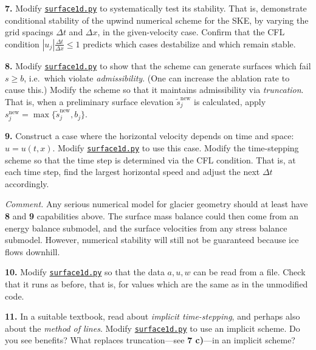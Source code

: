\documentclass[12pt]{amsart}
\newcommand{\prob}[1]{\bigskip\noindent\textbf{#1.}\quad }
\begin{document}
\prob{7}  Modify \href{https://github.com/bueler/mccarthy/blob/master/py/surface1d.py}{\texttt{surface1d.py}} to systematically test its stability.  That is, demonstrate conditional stability of the upwind numerical scheme for the SKE, by varying the grid spacings $\Delta t$ and $\Delta x$, in the given-velocity case.  Confirm that the CFL condition $|u_j| \frac{\Delta t}{\Delta x} \le 1$ predicts which cases destabilize and which remain stable.

\prob{8}  Modify \href{https://github.com/bueler/mccarthy/blob/master/py/surface1d.py}{\texttt{surface1d.py}} to show that the scheme can generate surfaces which fail $s\ge b$, i.e.~which violate \emph{admissibility}.  (One can increase the ablation rate to cause this.)  Modify the scheme so that it maintains admissibility via \emph{truncation}.  That is, when a preliminary surface elevation ${\tilde s}_j^{\text{new}}$ is calculated, apply $s_j^{\text{new}} = \max\{{\tilde s}_j^{\text{new}},b_j\}$.

\prob{9}  Construct a case where the horizontal velocity depends on time and space: $u=u(t,x)$.  Modify \href{https://github.com/bueler/mccarthy/blob/master/py/surface1d.py}{\texttt{surface1d.py}} to use this case.  Modify the time-stepping scheme so that the time step is determined via the CFL condition.  That is, at each time step, find the largest horizontal speed and adjust the next $\Delta t$ accordingly.

\medskip

\smallskip
\noindent \emph{Comment.}  Any serious numerical model for glacier geometry should at least have \textbf{8} and \textbf{9} capabilities above.  The surface mass balance could then come from an energy balance submodel, and the surface velocities from any stress balance submodel.   However, numerical stability will still not be guaranteed because ice flows downhill.

\prob{10}  Modify \href{https://github.com/bueler/mccarthy/blob/master/py/surface1d.py}{\texttt{surface1d.py}} so that the data $a,u,w$ can be read from a file.  Check that it runs as before, that is, for values which are the same as in the unmodified code.

\prob{11}  In a suitable textbook, read about \emph{implicit time-stepping}, and perhaps also about the \emph{method of lines}.  Modify \href{https://github.com/bueler/mccarthy/blob/master/py/surface1d.py}{\texttt{surface1d.py}} to use an implicit scheme.  Do you see benefits?  What replaces truncation---see \textbf{7 c)}---in an implicit scheme?
\end{document}
